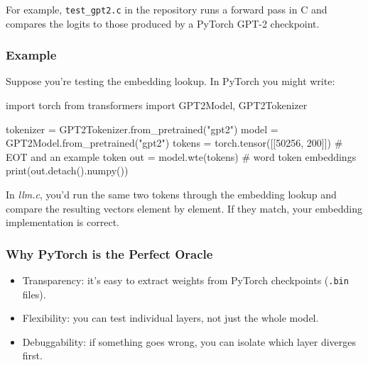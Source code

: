 \documentclass[
  letterpaper,
  DIV=11,
  numbers=noendperiod]{scrreprt}
\newenvironment{Shaded}{\begin{snugshade}}{\end{snugshade}}
\newcommand{\BuiltInTok}[1]{\textcolor[rgb]{0.00,0.23,0.31}{#1}}
\newcommand{\CommentTok}[1]{\textcolor[rgb]{0.37,0.37,0.37}{#1}}
\newcommand{\DecValTok}[1]{\textcolor[rgb]{0.68,0.00,0.00}{#1}}
\newcommand{\ImportTok}[1]{\textcolor[rgb]{0.00,0.46,0.62}{#1}}
\newcommand{\NormalTok}[1]{\textcolor[rgb]{0.00,0.23,0.31}{#1}}
\newcommand{\OperatorTok}[1]{\textcolor[rgb]{0.37,0.37,0.37}{#1}}
\newcommand{\StringTok}[1]{\textcolor[rgb]{0.13,0.47,0.30}{#1}}
\providecommand{\tightlist}{%
  \setlength{\itemsep}{0pt}\setlength{\parskip}{0pt}}
\begin{document}
For example, \texttt{test\_gpt2.c} in the repository runs a forward pass
in C and compares the logits to those produced by a PyTorch GPT-2
checkpoint.

\subsubsection{Example}\label{example-1}

Suppose you're testing the embedding lookup. In PyTorch you might write:

\begin{Shaded}
\begin{Highlighting}[]
\ImportTok{import}\NormalTok{ torch}
\ImportTok{from}\NormalTok{ transformers }\ImportTok{import}\NormalTok{ GPT2Model, GPT2Tokenizer}

\NormalTok{tokenizer }\OperatorTok{=}\NormalTok{ GPT2Tokenizer.from\_pretrained(}\StringTok{"gpt2"}\NormalTok{)}
\NormalTok{model }\OperatorTok{=}\NormalTok{ GPT2Model.from\_pretrained(}\StringTok{"gpt2"}\NormalTok{)}
\NormalTok{tokens }\OperatorTok{=}\NormalTok{ torch.tensor([[}\DecValTok{50256}\NormalTok{, }\DecValTok{200}\NormalTok{]])  }\CommentTok{\# EOT and an example token}
\NormalTok{out }\OperatorTok{=}\NormalTok{ model.wte(tokens)  }\CommentTok{\# word token embeddings}
\BuiltInTok{print}\NormalTok{(out.detach().numpy())}
\end{Highlighting}
\end{Shaded}

In \emph{llm.c}, you'd run the same two tokens through the embedding
lookup and compare the resulting vectors element by element. If they
match, your embedding implementation is correct.

\subsubsection{Why PyTorch is the Perfect
Oracle}\label{why-pytorch-is-the-perfect-oracle}

\begin{itemize}
\tightlist
\item
  Transparency: it's easy to extract weights from PyTorch checkpoints
  (\texttt{.bin} files).
\item
  Flexibility: you can test individual layers, not just the whole model.
\item
  Debuggability: if something goes wrong, you can isolate which layer
  diverges first.
\end{itemize}
\end{document}
